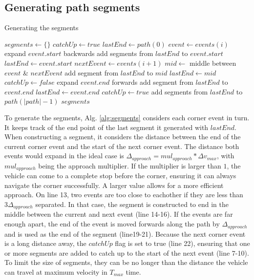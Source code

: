 \subsection{Generating path segments}
\begin{algorithm}
\caption{Generating the segments}
\label{alg:segments}
\begin{algorithmic}[1]
\State $segments \leftarrow \{\}$
\State $catchUp \leftarrow true$
\State $lastEnd \leftarrow path(0)$
\State $event \leftarrow events(i)$
	\State expand $event.start$ backwards
	\State add segments from $lastEnd$ to $event.start$
	\State $lastEnd \leftarrow event.start$
\EndIf
\State $nextEvent \leftarrow events(i+1)$
	\State $mid \leftarrow$ middle between $event$ \& $nextEvent$
	\State add segment from $lastEnd$ to $mid$
	\State $lastEnd \leftarrow mid$
	\State $catchUp \leftarrow false$
\Else
	\State expand $event.end$ forwards
	\State add segment from $lastEnd$ to $event.end$
	\State $lastEnd \leftarrow event.end$
	\State $catchUp \leftarrow true$
\EndIf
\EndFor
\State add segments from $lastEnd$ to $path(|path|-1)$
\Return $segments$
\EndFunction
\end{algorithmic}
\end{algorithm}
To generate the segments, Alg. \ref{alg:segments} considers each corner event in turn. It keeps track of the end point of the last segment it generated with $lastEnd$. When constructing a segment, it considers the distance between the end of the current corner event and the start of the next corner event. The distance both events would expand in the ideal case is $\Delta_{approach} =  mul_{approach} * \Delta v_{max}$, with $mul_{approach}$ being the approach multiplier. If the multiplier is larger than $1$, the vehicle can come to a complete stop before the corner, ensuring it can always navigate the corner successfully. A larger value allows for a more efficient approach. On line 13, two events are too close to eachother if they are less than $3 \Delta_{approach}$ separated. In that case, the segment is constructed to end in the middle between the current and next event (line 14-16). If the events are far enough apart, the end of the event is moved forwards along the path by $\Delta_{approach}$ and is used as the end of the segment (line19-21). Because the next corner event is a long distance away, the $catchUp$ flag is set to true (line 22), ensuring that one or more segments are added to catch up to the start of the next event (line 7-10). To limit the size of segments, they can be no longer than the distance the vehicle can travel at maximum velocity in $T_{max}$ time.
